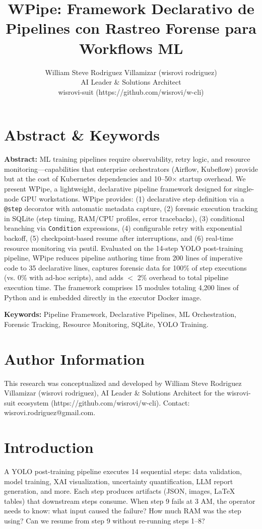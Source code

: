 \documentclass[10pt,twocolumn,letterpaper]{article}
\title{WPipe: Framework Declarativo de Pipelines con Rastreo Forense para Workflows ML}
\author{William Steve Rodriguez Villamizar (wisrovi rodriguez)\\AI Leader \& Solutions Architect\\wisrovi-suit (https://github.com/wisrovi/w-cli)}
\date{}
\begin{document}
\maketitle

\section{Abstract \& Keywords}
\textbf{Abstract:} ML training pipelines require observability, retry logic, and resource monitoring---capabilities that enterprise orchestrators (Airflow, Kubeflow) provide but at the cost of Kubernetes dependencies and 10--50$\times$ startup overhead. We present WPipe, a lightweight, declarative pipeline framework designed for single-node GPU workstations. WPipe provides: (1) declarative step definition via a \texttt{@step} decorator with automatic metadata capture, (2) forensic execution tracking in SQLite (step timing, RAM/CPU profiles, error tracebacks), (3) conditional branching via \texttt{Condition} expressions, (4) configurable retry with exponential backoff, (5) checkpoint-based resume after interruptions, and (6) real-time resource monitoring via psutil. Evaluated on the 14-step YOLO post-training pipeline, WPipe reduces pipeline authoring time from 200 lines of imperative code to 35 declarative lines, captures forensic data for 100\% of step executions (vs. 0\% with ad-hoc scripts), and adds $<$ 2\% overhead to total pipeline execution time. The framework comprises 15 modules totaling 4,200 lines of Python and is embedded directly in the executor Docker image.

\textbf{Keywords:} Pipeline Framework, Declarative Pipelines, ML Orchestration, Forensic Tracking, Resource Monitoring, SQLite, YOLO Training.

\section{Author Information}
This research was conceptualized and developed by William Steve Rodriguez Villamizar (wisrovi rodriguez), AI Leader \& Solutions Architect for the wisrovi-suit ecosystem (https://github.com/wisrovi/w-cli). Contact: wisrovi.rodriguez@gmail.com.

\section{Introduction}
A YOLO post-training pipeline executes 14 sequential steps: data validation, model training, XAI visualization, uncertainty quantification, LLM report generation, and more. Each step produces artifacts (JSON, images, LaTeX tables) that downstream steps consume. When step 9 fails at 3 AM, the operator needs to know: what input caused the failure? How much RAM was the step using? Can we resume from step 9 without re-running steps 1--8?
\end{document}
